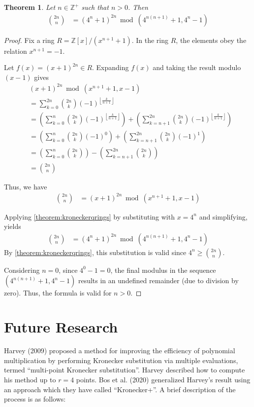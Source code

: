 \documentclass[11pt,reqno]{article}
\theoremstyle{plain}
\newtheorem{theorem}{Theorem}
\theoremstyle{definition}
\newcommand{\floor}[1]{\left\lfloor #1 \right\rfloor}
\begin{document}
\begin{theorem} \label{theorem:cbc}
Let $n \in \mathbb{Z}^+$ such that $n > 0$. Then
\begin{align*}
\binom{2n}{n} &= (4^n + 1)^{2n} \bmod{(4^{n(n+1)} + 1, 4^n - 1)}
\end{align*}
\end{theorem}
\begin{proof}
Fix a ring $R = \mathbb{Z}[x]/(x^{n+1} + 1)$. In the ring $R$, the elements obey the relation $x^{n+1} = -1$.

Let $f(x) = (x + 1)^{2n} \in R$. Expanding $f(x)$ and taking the result modulo $(x-1)$ gives
\begin{align*}
& (x + 1)^{2n} \bmod{(x^{n+1} + 1, x - 1)} \\
&= \sum_{k=0}^{2n} \binom{2n}{k} (-1)^{\floor{\frac{k}{n+1}}} \\
&= \left( \sum_{k=0}^{n} \binom{2n}{k} (-1)^{\floor{\frac{k}{n+1}}} \right) + \left( \sum_{k=n+1}^{2n} \binom{2n}{k} (-1)^{\floor{\frac{k}{n+1}}} \right) \\
&= \left( \sum_{k=0}^{n} \binom{2n}{k} (-1)^0 \right) + \left( \sum_{k=n+1}^{2n} \binom{2n}{k} (-1)^1 \right) \\
&= \left( \sum_{k=0}^{n} \binom{2n}{k} \right) - \left( \sum_{k=n+1}^{2n} \binom{2n}{k} \right) \\
&= \binom{2n}{n}
\end{align*}

Thus, we have
\begin{align*}
    \binom{2n}{n} &= (x + 1)^{2n} \bmod{(x^{n+1} + 1, x - 1)}
\end{align*}

Applying \cref{theorem:kroneckerqrings} by substituting with $x = 4^n$ and simplifying, yields
\begin{align*}
    \binom{2n}{n} &= (4^n + 1)^{2n} \bmod{(4^{n(n+1)} + 1, 4^n-1)}
\end{align*}
By \cref{theorem:kroneckerqrings}, this substitution is valid since $4^n \geq \binom{2n}{n}$.

Considering $n = 0$, since $4^0-1 = 0$, the final modulus in the sequence $(4^{n(n+1)} + 1, 4^n-1)$ results in an undefined remainder (due to division by zero). Thus, the formula is valid for $n > 0$.
\end{proof}

\section{Future Research} \label{section:futureresearch}
Harvey (2009) \cite{harvey2009kronecker} proposed a method for improving the efficiency of polynomial multiplication by performing Kronecker substitution via multiple evaluations, termed ``multi-point Kronecker substitution''. Harvey described how to compute his method up to $r=4$ points. Bos et al. (2020) \cite{bos2020postquantum} generalized Harvey's result using an approach which they have called ``Kronecker+''. A brief description of the process is as follows:
\end{document}
